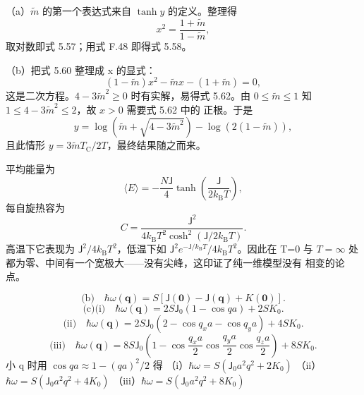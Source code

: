  （a）$\tilde{m}$ 的第一个表达式来自 $\tanh y$ 的定义。整理得
\begin{equation*}
x^{2} = \frac{1+\tilde{m}}{1-\tilde{m}},\tag{F.57}
\end{equation*}
取对数即式 5.57；用式 F.48 即得式 5.58。

（b）把式 5.60 整理成 x 的显式：
\begin{equation*}
(1-\tilde{m})x^{2} - \tilde{m}x - (1+\tilde{m}) = 0,\tag{F.58}
\end{equation*}
这是二次方程。$4-3\tilde{m}^{2}\geq0$ 时有实解，易得式 5.62。由
$0\leq\tilde{m}\leq1$ 知 $1\leq4-3\tilde{m}^{2}\leq2$，故 $x>0$ 需要式 5.62 中的
正根。于是
\begin{equation*}
y = \log(\tilde{m}+\sqrt{4-3\tilde{m}^{2}}) - \log(2(1-\tilde{m})),\tag{F.59}
\end{equation*}
且此情形 $y=3\tilde{m}T_{\mathrm{C}}/2T$，最终结果随之而来。

 平均能量为
\begin{equation*}
\langle E\rangle = -\frac{N\mathsf{J}}{4}\tanh\left(\frac{\mathsf{J}}{2k_{\mathrm{B}}T}\right),\tag{F.60}
\end{equation*}
每自旋热容为
\begin{equation*}
C = \frac{\mathsf{J}^{2}}{4k_{\mathrm{B}}T^{2}\cosh^{2}(\mathsf{J}/2k_{\mathrm{B}}T)}.\tag{F.61}
\end{equation*}
高温下它表现为 $\mathsf{J}^{2}/4k_{\mathrm{B}}T^{2}$，低温下如
$\mathsf{J}^{2}e^{-\mathsf{J}/k_{\mathrm{B}}T}/4k_{\mathrm{B}}T^{2}$。因此在
T=0 与 $T=\infty$ 处都为零、中间有一个宽极大——没有尖峰，这印证了纯一维模型没有
相变的论点。

\begin{equation*}
\text{(b)}\quad \hbar\omega(\mathbf{q}) = S[\mathsf{J}(\mathbf{0})-\mathsf{J}(\mathbf{q})+K(\mathbf{0})].
\end{equation*}
\begin{equation*}
\text{(c)(i)}\quad \hbar\omega(\mathbf{q}) = 2S\mathsf{J}_0(1-\cos qa) + 2SK_0.
\end{equation*}
\begin{equation*}
\text{(ii)}\quad \hbar\omega(\mathbf{q}) = 2S\mathsf{J}_0(2-\cos q_xa-\cos q_ya) + 4SK_0.
\end{equation*}
\begin{equation*}
\text{(iii)}\quad \hbar\omega(\mathbf{q}) = 8S\mathsf{J}_0\left(1-\cos\frac{q_xa}{2}\cos\frac{q_ya}{2}\cos\frac{q_za}{2}\right) + 8SK_0.
\end{equation*}
 小 q 时用 $\cos qa\approx1-(qa)^{2}/2$ 得
（i）$\hbar\omega = S(\mathsf{J}_0a^{2}q^{2}+2K_0)$
（ii）$\hbar\omega = S(\mathsf{J}_0a^{2}q^{2}+4K_0)$
（iii）$\hbar\omega = S(\mathsf{J}_0a^{2}q^{2}+8K_0)$

